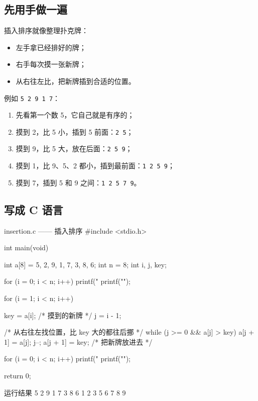 \subsection{先用手做一遍}

插入排序就像整理扑克牌：

\begin{itemize}
  \item 左手拿已经排好的牌；
  \item 右手每次摸一张新牌；
  \item 从右往左比，把新牌插到合适的位置。
\end{itemize}

例如 \texttt{5 2 9 1 7}：

\begin{enumerate}
  \item 先看第一个数 5，它自己就是有序的；
  \item 摸到 2，比 5 小，插到 5 前面：\texttt{2 5}；
  \item 摸到 9，比 5 大，放在后面：\texttt{2 5 9}；
  \item 摸到 1，比 9、5、2 都小，插到最前面：\texttt{1 2 5 9}；
  \item 摸到 7，插到 5 和 9 之间：\texttt{1 2 5 7 9}。
\end{enumerate}

\subsection{写成 C 语言}

\begin{codebox}{insertion.c —— 插入排序}
#include <stdio.h>

int main(void)
{
    int a[8] = {5, 2, 9, 1, 7, 3, 8, 6};
    int n = 8;
    int i, j, key;

    for (i = 0; i < n; i++) {
        printf("%
    }
    printf("\n");

    for (i = 1; i < n; i++) {
        key = a[i];             /* 摸到的新牌 */
        j = i - 1;

        /* 从右往左找位置，比 key 大的都往后挪 */
        while (j >= 0 && a[j] > key) {
            a[j + 1] = a[j];
            j--;
        }
        a[j + 1] = key;         /* 把新牌放进去 */
    }

    for (i = 0; i < n; i++) {
        printf("%
    }
    printf("\n");

    return 0;
}
\end{codebox}

\begin{outbox}{运行结果}
5 2 9 1 7 3 8 6
1 2 3 5 6 7 8 9
\end{outbox}

